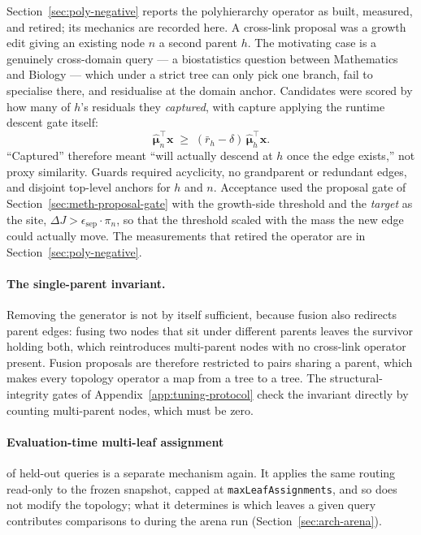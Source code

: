 Section~\ref{sec:poly-negative} reports the polyhierarchy operator as
built, measured, and retired; its mechanics are recorded here.
A cross-link proposal was a growth edit giving an existing node $n$ a
second parent $h$. The motivating case is a genuinely cross-domain
query --- a biostatistics question between Mathematics and Biology ---
which under a strict tree can only pick one branch, fail to specialise
there, and residualise at the domain anchor. Candidates were scored by how many of $h$'s
residuals they \emph{captured}, with capture applying the runtime
descent gate itself:
\[
\hat{\boldsymbol{\mu}}_n^\top \mathbf{x}
\;\geq\;
(\bar{r}_h - \delta)\,
\hat{\boldsymbol{\mu}}_h^\top \mathbf{x}.
\]
``Captured'' therefore meant ``will actually descend at $h$ once the
edge exists,'' not proxy similarity.
Guards required acyclicity, no grandparent or redundant edges, and
disjoint top-level anchors for $h$ and $n$.
Acceptance used the proposal gate of
Section~\ref{sec:meth-proposal-gate} with the growth-side threshold
and the \emph{target} as the site,
$\Delta J > \epsilon_{\text{sep}} \cdot \pi_n$, so that the threshold
scaled with the mass the new edge could actually move.
The measurements that retired the operator are in
Section~\ref{sec:poly-negative}.

\paragraph{The single-parent invariant.}
Removing the generator is not by itself sufficient, because fusion also
redirects parent edges: fusing two nodes that sit under different
parents leaves the survivor holding both, which reintroduces
multi-parent nodes with no cross-link operator present.
Fusion proposals are therefore restricted to pairs sharing a parent,
which makes every topology operator a map from a tree to a tree.
The structural-integrity gates of Appendix~\ref{app:tuning-protocol}
check the invariant directly by counting multi-parent nodes, which must
be zero.

\paragraph{Evaluation-time multi-leaf assignment} of held-out queries
is a separate mechanism again. It applies the same routing read-only to
the frozen snapshot, capped at \texttt{maxLeafAssignments}, and so does
not modify the topology; what it determines is which leaves a given
query contributes comparisons to during the arena run
(Section~\ref{sec:arch-arena}).
